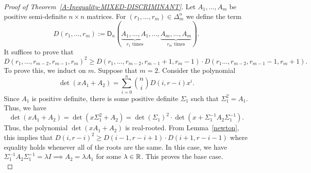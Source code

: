 \documentclass{puthesis-UG}
\begin{document}
\begin{proof}[Proof of Theorem~\ref{A-Inequality-MIXED-DISCRIMINANT}]
	Let $A_1, \ldots, A_m$ be positive semi-definite $n \times n$ matrices. For $(r_1, \ldots, r_m) \in \Delta_m^{n}$ we define the term
	\[
		D(r_1, \ldots, r_m) := \mathsf{D}_n \left ( \underbrace{A_1, \ldots, A_1}_{r_1 \text{ times}}, \ldots, \underbrace{A_m, \ldots, A_m}_{r_m \text{ times}} \right ).
	\] 
	It suffices to prove that 
	\[
		D(r_1, \ldots, r_{m-2}, r_{m-1}, r_m)^2 \geq D(r_1, \ldots, r_{m-2}, r_{m-1}+1, r_m-1) \cdot D(r_1 \ldots, r_{m-2}, r_{m-1}-1, r_m+1).
	\]
	To prove this, we induct on $m$. Suppose that $m=2$. Consider the polynomial 
	\[
		\det (xA_1 + A_2) = \sum_{i = 0}^n \binom{n}{i} D(i, r-i) x^i.
	\]
	Since $A_1$ is positive definite, there is some positive definite $\Sigma_1$ such that $\Sigma_1^2 = A_1$. Thus, we have 
	\[
		\det (xA_1 + A_2) = \det (x\Sigma_1^2 + A_2) = \det (\Sigma_1)^2 \cdot \det (x + \Sigma_1^{-1} A_2 \Sigma_1^{-1}).
	\]
	Thus, the polynomial $\det (xA_1 + A_2)$ is real-rooted. From Lemma~\ref{newton}, this implies that $D(i, r-i)^2 \geq D(i-1, r-i+1) \cdot D(i+1, r-i-1)$ where equality holds whenever all of the roots are the same. In this case, we have $\Sigma_1^{-1} A_2 \Sigma_1^{-1} = \lambda I \implies A_2 = \lambda A_1$ for some $\lambda \in \mathbb{R}$. This proves the base case. \\


\end{proof}
\end{document}
